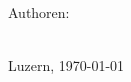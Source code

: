 \begin{titlepage}
    \noindent\begin{minipage}{0.8\textwidth}
        \begin{flushleft}
            Authoren:\\
            \large{\makeatletter \@author \makeatother}\\
            \vspace{4mm}
        \end{flushleft}
    \end{minipage}

    \vspace{2mm}

    \begin{center}
        Luzern, \today 
    \end{center}

\end{titlepage}
\clearpage
